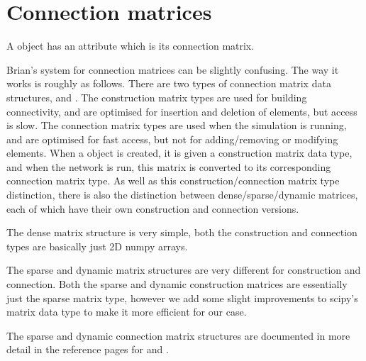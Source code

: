 \documentclass[letterpaper,10pt,english]{manual}
\begin{document}
\resetcurrentobjects
\hypertarget{--doc-advanced_connection_matrices}{}

\section{Connection matrices}

A \hyperlink{brian.Connection}{} object has an attribute  which is its connection
matrix.

Brian's system for connection matrices can be slightly confusing. The way it
works is roughly as follows. There are two types of connection matrix data
structures, \hyperlink{brian.ConstructionMatrix}{} and \hyperlink{brian.ConnectionMatrix}{}. The
construction matrix types are used for building connectivity, and are optimised
for insertion and deletion of elements, but access is slow. The connection
matrix types are used when the simulation is running, and are optimised for
fast access, but not for adding/removing or modifying elements. When a
\hyperlink{brian.Connection}{} object is created, it is given a construction matrix data
type, and when the network is run, this matrix is converted to its corresponding
connection matrix type. As well as this construction/connection matrix type
distinction, there is also the distinction between dense/sparse/dynamic matrices,
each of which have their own construction and connection versions.

The dense matrix structure is very simple, both the construction and connection
types are basically just 2D numpy arrays.

The sparse and dynamic matrix structures are very different for construction
and connection. Both the sparse and dynamic construction matrices are
essentially just the  sparse matrix type, however we add
some slight improvements to scipy's matrix data type to make it more efficient
for our case.

The sparse and dynamic connection matrix structures are documented in more
detail in the reference pages for \hyperlink{brian.SparseConnectionMatrix}{} and
\hyperlink{brian.DynamicConnectionMatrix}{}.
\end{document}
